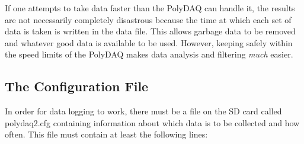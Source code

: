 If one attempts to take data faster than the Poly\-D\-A\-Q can handle it, the results are not necessarily completely disastrous because the time at which each set of data is taken is written in the data file. This allows garbage data to be removed and whatever good data is available to be used. However, keeping safely within the speed limits of the Poly\-D\-A\-Q makes data analysis and filtering {\itshape much} easier.\hypertarget{pd_setup_pds_sd_config}{}\subsection{The Configuration File}\label{pd_setup_pds_sd_config}
In order for data logging to work, there must be a file on the S\-D card called {\ttfamily polydaq2.\-cfg} containing information about which data is to be collected and how often. This file must contain at least the following lines\-:
